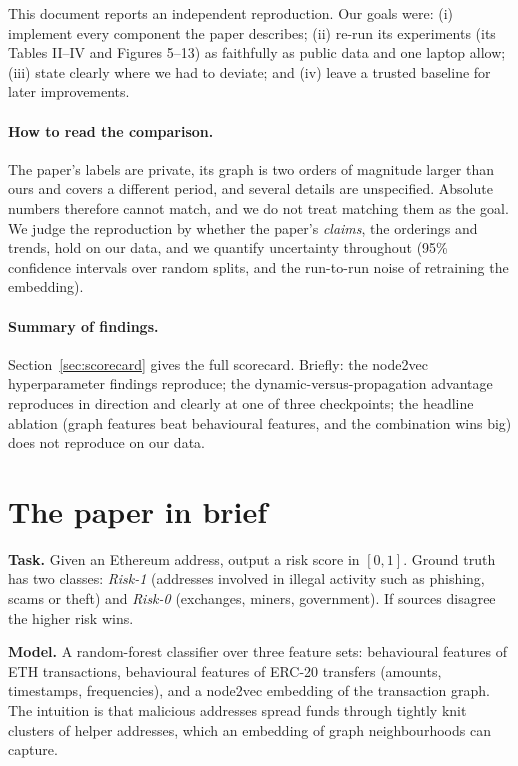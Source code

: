 \documentclass[11pt,a4paper]{article}
\begin{document}
This document reports an independent reproduction. Our goals were: (i) implement every component the paper describes; (ii) re-run its experiments (its Tables II--IV and Figures 5--13) as faithfully as public data and one laptop allow; (iii) state clearly where we had to deviate; and (iv) leave a trusted baseline for later improvements.

\paragraph{How to read the comparison.} The paper's labels are private, its graph is two orders of magnitude larger than ours and covers a different period, and several details are unspecified. Absolute numbers therefore cannot match, and we do not treat matching them as the goal. We judge the reproduction by whether the paper's \emph{claims}, the orderings and trends, hold on our data, and we quantify uncertainty throughout (95\% confidence intervals over random splits, and the run-to-run noise of retraining the embedding).

\paragraph{Summary of findings.} Section~\ref{sec:scorecard} gives the full scorecard. Briefly: the node2vec hyperparameter findings reproduce; the dynamic-versus-propagation advantage reproduces in direction and clearly at one of three checkpoints; the headline ablation (graph features beat behavioural features, and the combination wins big) does not reproduce on our data.

\section{The paper in brief}
\label{sec:paper}
\textbf{Task.} Given an Ethereum address, output a risk score in $[0,1]$. Ground truth has two classes: \emph{Risk-1} (addresses involved in illegal activity such as phishing, scams or theft) and \emph{Risk-0} (exchanges, miners, government). If sources disagree the higher risk wins.

\textbf{Model.} A random-forest classifier over three feature sets: behavioural features of ETH transactions, behavioural features of ERC-20 transfers (amounts, timestamps, frequencies), and a node2vec embedding of the transaction graph. The intuition is that malicious addresses spread funds through tightly knit clusters of helper addresses, which an embedding of graph neighbourhoods can capture.
\end{document}
